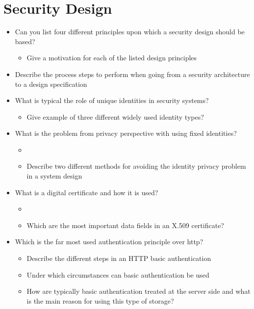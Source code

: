 \section{Security Design}\label{sec:Security_Design}
\begin{itemize}
\item Can you list four different principles upon which a security design should be based?
  \begin{itemize}[noitemsep]
  \item Give a motivation for each of the listed design principles
  \end{itemize}

\item Describe the process steps to perform when going from a security architecture to a design specification
\item What is typical the role of unique identities in security systems?
  \begin{itemize}[noitemsep]
  \item Give example of three different widely used identity types?
  \end{itemize}

\item What is the problem from privacy perspective with using fixed identities?
  \begin{itemize}[noitemsep]
  \item \item Describe two different methods for avoiding the identity privacy problem in a system design
  \end{itemize}

\item What is a digital certificate and how it is used?
  \begin{itemize}[noitemsep]
  \item \item Which are the most important data fields in an X.509 certificate?
  \end{itemize}

\item Which is the far most used authentication principle over http?
  \begin{itemize}[noitemsep]
  \item Describe the different steps in an HTTP basic authentication
  \item Under which circumstances can basic authentication be used
  \item How are typically basic authentication treated at the server side and what is the main reason for using this type of storage?
  \end{itemize}


\end{itemize}
